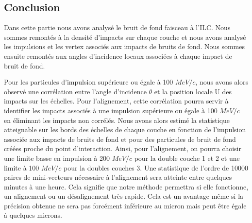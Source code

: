   
  \subsection{Conclusion}

   Dans cette partie nous avons analys\'e le bruit de fond faisceau \`a l'ILC. Nous sommes remont\'es \`a la densit\'e d'impacts sur chaque couche et nous avons analys\'e les impulsions et les vertex associ\'es aux impacts de bruits de fond. Nous sommes ensuite remont\'es aux angles d'incidence locaux associ\'ees \`a chaque impact de bruit de fond. 
   
   \medskip
   
   Pour les particules d'impulsion sup\'erieure ou \'egale \`a 100 $MeV/c$, nous avons alors observ\'e une corr\'elation entre l'angle d'incidence $\theta$ et la position locale U des impacts sur les \'echelles. Pour l'alignement, cette corrélation pourra servir \`a identifier les impacts associ\'es \`a une impulsion sup\'erieure ou \'egale \`a 100 $MeV/c$ en \'eliminant les impacts non corr\'el\'es. Nous avons alors estimé la statistique atteignable sur les bords des \'echelles de chaque couche en fonction de l'impulsion associ\'ee aux impacts de bruits de fond et pour des particules de bruit de fond cr\'e\'ees proche du point d'interaction. Ainsi, pour l'alignement, on pourra choisir une limite basse en impulsion à 200 $MeV/c$ pour la double couche 1 et 2 et une limite à 100 $MeV/c$ pour la doubles couches 3. Une statistique de l'ordre de 10000 paires de mini-vecteurs nécessaire à l'alignement sera atteinte entre quelques minutes à une heure. Cela signifie que notre m\'ethode permettra si elle fonctionne, un alignement ou un d\'esalignement tr\`es rapide. Cela est un avantage m\^eme si la pr\'ecision obtenue ne sera pas forc\'ement inf\'erieure au micron mais peut \^etre \'egale \`a quelques microns.
   
  \medskip   
   
